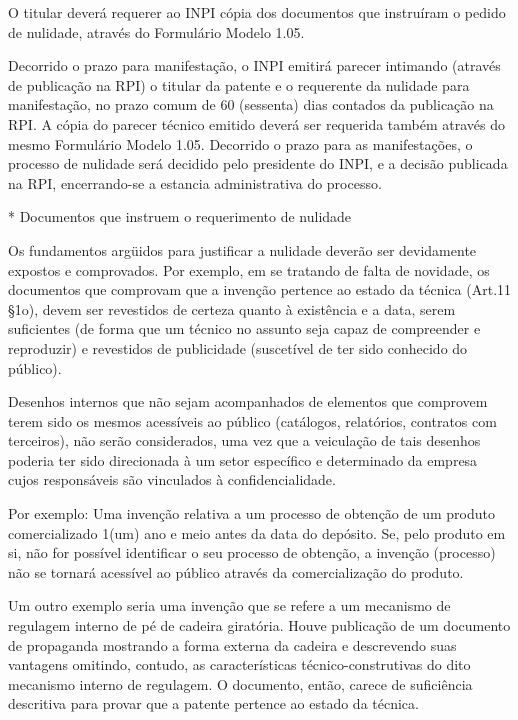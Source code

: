 \documentclass[12pt]{article}
\begin{document}
     O titular deverá requerer ao INPI cópia dos documentos que
     instruíram o pedido de nulidade, através do Formulário Modelo
     1.05.
     
     Decorrido o prazo para manifestação, o INPI emitirá parecer
     intimando (através de publicação na RPI) o titular da patente e o
     requerente da nulidade para manifestação, no prazo comum de 60
     (sessenta) dias contados da publicação na RPI. A cópia do parecer
     técnico emitido deverá ser requerida também através do mesmo
     Formulário Modelo 1.05. Decorrido o prazo para as manifestações,
     o processo de nulidade será decidido pelo presidente do INPI, e a
     decisão publicada na RPI, encerrando-se a estancia administrativa
     do processo.

     * Documentos que instruem o requerimento de nulidade
     
     Os fundamentos argüidos para justificar a nulidade deverão ser
     devidamente expostos e comprovados.  Por exemplo, em se tratando
     de falta de novidade, os documentos que comprovam que a invenção
     pertence ao estado da técnica (Art.11 §1o), devem ser revestidos
     de certeza quanto à existência e a data, serem suficientes (de
     forma que um técnico no assunto seja capaz de compreender e
     reproduzir) e revestidos de publicidade (suscetível de ter sido
     conhecido do público).
     
     Desenhos internos que não sejam acompanhados de elementos que
     comprovem terem sido os mesmos acessíveis ao público (catálogos,
     relatórios, contratos com terceiros), não serão considerados, uma
     vez que a veiculação de tais desenhos poderia ter sido
     direcionada à um setor específico e determinado da empresa cujos
     responsáveis são vinculados à confidencialidade.
     
     Por exemplo: Uma invenção relativa a um processo de obtenção de
     um produto comercializado 1(um) ano e meio antes da data do
     depósito. Se, pelo produto em si, não for possível identificar o
     seu processo de obtenção, a invenção (processo) não se tornará
     acessível ao público através da comercialização do produto.
     
     Um outro exemplo seria uma invenção que se refere a um mecanismo
     de regulagem interno de pé de cadeira giratória. Houve publicação
     de um documento de propaganda mostrando a forma externa da
     cadeira e descrevendo suas vantagens omitindo, contudo, as
     características técnico-construtivas do dito mecanismo interno de
     regulagem. O documento, então, carece de suficiência descritiva
     para provar que a patente pertence ao estado da técnica.
     
\end{document}
